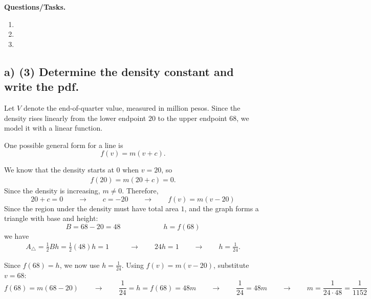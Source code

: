 	\textbf{Questions/Tasks.}
	\begin{enumerate}[label=\textbf{\alph*)}]
		\item {}
		\item {}
		\item {}
	\end{enumerate}
	
	\subsection*{a) \textbf{(3)} Determine the density constant and write the pdf.}
	\label{subsec:online-coffee-sales-investment-c1-a}
	Let $V$ denote the end-of-quarter value, measured in million pesos. Since the density rises linearly from the lower endpoint $20$ to the upper endpoint $68$, we model it with a linear function.
	
	One possible general form for a line is
	\[
	f(v)=m(v+c).
	\]
	
	We know that the density starts at $0$ when $v=20$, so
	\[
	\begin{aligned}
		f(20)=m(20+c)=0.
	\end{aligned}
	\]
	Since the density is increasing, \(m\neq 0\). Therefore,
	\[
	20+c=0
	\qquad \longrightarrow \qquad
	c=-20
	\qquad \longrightarrow \qquad
	f(v)=m(v-20)
	\]
	Since the region under the density must have total area \(1\), and the graph forms a triangle with base and height:
	\[
	B = 68-20=48
	\qquad \qquad  \qquad
	h = f(68)
	\]
	we have
	\[
	\begin{aligned}
		A_{\triangle}=\frac{1}{2}Bh
		=\frac{1}{2}(48)h
		=1
		&\qquad \longrightarrow \qquad
		24h=1
		\qquad \longrightarrow \qquad
		h=\frac{1}{24}.
	\end{aligned}
	\]
	
	Since \(f(68)=h\), we now use \(h=\frac{1}{24}\). Using \(f(v)=m(v-20)\), substitute \(v=68\):
	\[
	f(68)=m(68-20)
	\qquad \longrightarrow \qquad
	\frac{1}{24}=h=f(68)=48m
	\qquad \longrightarrow \qquad
	\frac{1}{24}=48m
	\qquad \longrightarrow \qquad
	m=\frac{1}{24 \cdot 48}=\frac{1}{1152}
	\]

